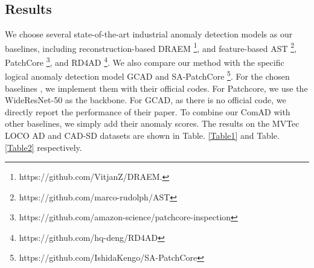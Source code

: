 \documentclass[final,5p,times,twocolumn]{elsarticle}
\begin{document}
\subsection{Results}
\label{4.3}
We choose several state-of-the-art industrial anomaly detection models as our baselines, including reconstruction-based DRAEM \cite{zavrtanik2021draem}\footnote{https://github.com/VitjanZ/DRAEM.}, and feature-based AST \cite{rudolph2023asymmetric}\footnote{https://github.com/marco-rudolph/AST}, PatchCore \cite{roth2022towards}\footnote{https://github.com/amazon-science/patchcore-inspection}, and RD4AD \cite{deng2022anomaly}\footnote{https://github.com/hq-deng/RD4AD}. We also compare our method with the specific logical anomaly detection model GCAD \cite{bergmann2022beyond} and SA-PatchCore \cite{ishida2023sa}\footnote{https://github.com/IshidaKengo/SA-PatchCore}. For the chosen baselines \cite{zavrtanik2021draem, rudolph2023asymmetric, roth2022towards, deng2022anomaly, ishida2023sa}, we implement them with their official codes. For Patchcore, we use the WideResNet-50 \cite{he2016deep} as the backbone. For GCAD, as there is no official code, we directly report the performance of their paper. To combine our ComAD with other baselines, we simply add their anomaly scores. The results on the MVTec LOCO AD and CAD-SD datasets are shown in Table. \ref{Table1} and Table. \ref{Table2} respectively.
\end{document}
